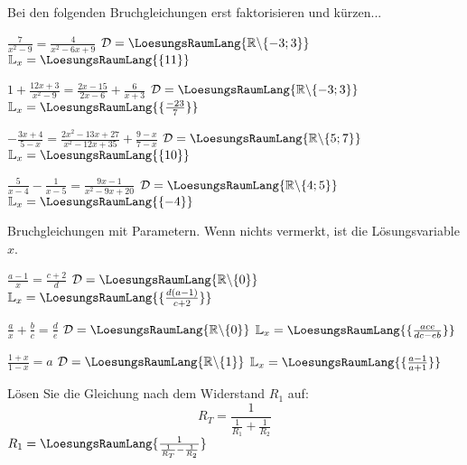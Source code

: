 \platzFuerBerechnungenBisEndeSeite{}

Bei den folgenden Bruchgleichungen erst faktorisieren und kürzen...

\begin{bbwAufgabenBlock}
\item $\frac7{x^2-9} = \frac4{x^2-6x+9}$ \hspace{10mm}    $\mathcal{D}= \LoesungsRaumLang{\mathbb{R}\backslash\{-3; 3\}}$ $\mathbb{L}_x = \LoesungsRaumLang{\{11\}}$
\item $1 + \frac{12x+3}{x^2-9} = \frac{2x-15}{2x-6} + \frac{6}{x+3}$ \hspace{10mm}    $\mathcal{D}= \LoesungsRaumLang{\mathbb{R}\backslash\{-3; 3\}}$ $\mathbb{L}_x = \LoesungsRaumLang{\{\frac{-23}{7}\}}$
\item $- \frac{3x+4}{5-x} = \frac{2x^2-13x+27}{x^2-12x+35} + \frac{9-x}{7-x}$ \hspace{10mm}    $\mathcal{D}= \LoesungsRaumLang{\mathbb{R}\backslash\{5;7\}}$ $\mathbb{L}_x = \LoesungsRaumLang{\{10\}}$\noTRAINER{\newpage}
\item $\frac5{x-4} - \frac1{x-5} = \frac{9x-1}{x^2-9x+20}$ \hspace{10mm}    $\mathcal{D}= \LoesungsRaumLang{\mathbb{R}\backslash\{4;5\}}$ $\mathbb{L}_x = \LoesungsRaumLang{\{-4\}}$
\end{bbwAufgabenBlock}



\platzFuerBerechnungenBisEndeSeite{}







Bruchgleichungen mit Parametern. Wenn nichts vermerkt, ist die
Lösungsvariable $x$.

\begin{bbwAufgabenBlock}
\item $\frac{a-1}x = \frac{c+2}d$ \hspace{10mm}    $\mathcal{D}= \LoesungsRaumLang{\mathbb{R}\backslash\{0\}}$ $\mathbb{L}_x = \LoesungsRaumLang{\{\frac{d(a-1)}{c+2}\}}$
\item $\frac{a}x + \frac{b}c = \frac{d}e$ \hspace{10mm}    $\mathcal{D}= \LoesungsRaumLang{\mathbb{R}\backslash\{0\}}$ $\mathbb{L}_x = \LoesungsRaumLang{\{\frac{ace}{dc-eb}\}}$
\item $\frac{1+x}{1-x} = a$ \hspace{10mm}    $\mathcal{D}= \LoesungsRaumLang{\mathbb{R}\backslash\{1\}}$ $\mathbb{L}_x = \LoesungsRaumLang{\{\frac{a-1}{a+1}\}}$\noTRAINER{\newpage}
\item Lösen Sie die Gleichung nach dem Widerstand $R_1$ auf:
      $$R_T = \frac1{\frac1{R_1} + \frac1{R_2}}$$    $R_1 = \LoesungsRaumLang{\frac1{\frac1{R_T}-\frac1{R_2}}}$
\end{bbwAufgabenBlock}


